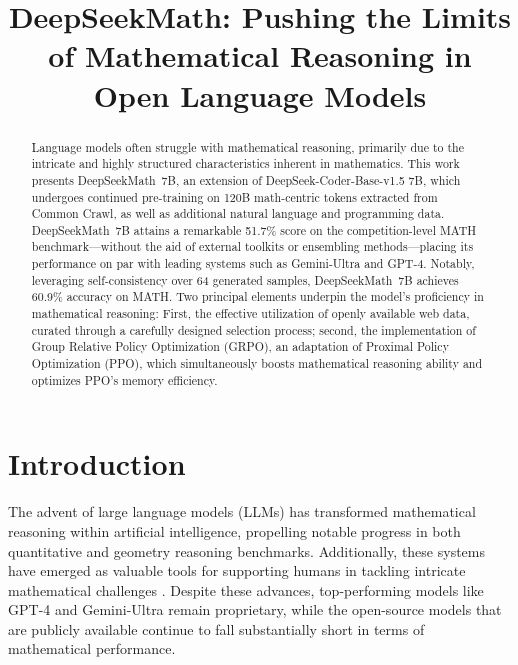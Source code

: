 \title{DeepSeekMath: Pushing the Limits of Mathematical Reasoning in Open Language Models}

\begin{abstract}
Language models often struggle with mathematical reasoning, primarily due to the intricate and highly structured characteristics inherent in mathematics. This work presents DeepSeekMath~7B, an extension of DeepSeek-Coder-Base-v1.5 7B, which undergoes continued pre-training on 120B math-centric tokens extracted from Common Crawl, as well as additional natural language and programming data. DeepSeekMath~7B attains a remarkable 51.7\% score on the competition-level MATH benchmark—without the aid of external toolkits or ensembling methods—placing its performance on par with leading systems such as Gemini-Ultra and GPT-4. Notably, leveraging self-consistency over 64 generated samples, DeepSeekMath~7B achieves 60.9\% accuracy on MATH. Two principal elements underpin the model’s proficiency in mathematical reasoning: First, the effective utilization of openly available web data, curated through a carefully designed selection process; second, the implementation of Group Relative Policy Optimization (GRPO), an adaptation of Proximal Policy Optimization (PPO), which simultaneously boosts mathematical reasoning ability and optimizes PPO’s memory efficiency.
\end{abstract}

\section{Introduction}

The advent of large language models (LLMs) has transformed mathematical reasoning within artificial intelligence, propelling notable progress in both quantitative \citep{MATH} and geometry \citep{trinh2024solving} reasoning benchmarks. Additionally, these systems have emerged as valuable tools for supporting humans in tackling intricate mathematical challenges \citep{tao}. Despite these advances, top-performing models like GPT-4 \citep{gpt4} and Gemini-Ultra \citep{gemini} remain proprietary, while the open-source models that are publicly available continue to fall substantially short in terms of mathematical performance.

